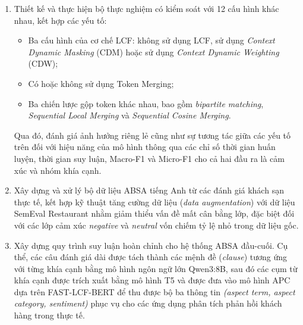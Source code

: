 \begin{enumerate}
\begin{itemize}
        \item \textbf{Sequential Cosine Merging (SCM)}: duyệt tuần tự chuỗi token theo vị trí từ trái sang phải, tại mỗi bước chọn token trái nhất chưa được bảo vệ và gộp với token có độ tương đồng cosine cao nhất trong toàn chuỗi, đồng thời bảo vệ các token thuộc vị trí khía cạnh (được đánh dấu bởi LCF) nhằm hạn chế mất mát thông tin ngữ nghĩa quan trọng.
    \end{itemize}

\item Thiết kế và thực hiện bộ thực nghiệm có kiểm soát với 12 cấu hình khác nhau, kết hợp các yếu tố:
\begin{itemize}
    \item Ba cấu hình của cơ chế LCF: không sử dụng LCF, sử dụng \textit{Context Dynamic Masking} (CDM) hoặc sử dụng \textit{Context Dynamic Weighting} (CDW);
    
    \item Có hoặc không sử dụng Token Merging;
    
    \item Ba chiến lược gộp token khác nhau, bao gồm \textit{bipartite matching}, \textit{Sequential Local Merging} và \textit{Sequential Cosine Merging}.
\end{itemize}
Qua đó, đánh giá ảnh hưởng riêng lẻ cũng như sự tương tác giữa các yếu tố trên đối với hiệu năng của mô hình thông qua các chỉ số thời gian huấn luyện, thời gian suy luận, Macro-F1 và Micro-F1 cho cả hai đầu ra là cảm xúc và nhóm khía cạnh.

    \item Xây dựng và xử lý bộ dữ liệu ABSA tiếng Anh từ các đánh giá khách sạn thực tế, kết hợp kỹ thuật tăng cường dữ liệu (\textit{data augmentation}) với dữ liệu SemEval Restaurant nhằm giảm thiểu vấn đề mất cân bằng lớp, đặc biệt đối với các lớp cảm xúc \textit{negative} và \textit{neutral} vốn chiếm tỷ lệ nhỏ trong dữ liệu gốc.

    \item Xây dựng quy trình suy luận hoàn chỉnh cho hệ thống ABSA đầu-cuối. Cụ thể, các câu đánh giá dài được tách thành các mệnh đề (\textit{clause}) tương ứng với từng khía cạnh bằng mô hình ngôn ngữ lớn Qwen3:8B, sau đó các cụm từ khía cạnh được trích xuất bằng mô hình T5 và được đưa vào mô hình APC dựa trên FAST-LCF-BERT để thu được bộ ba thông tin \textit{(aspect term, aspect category, sentiment)} phục vụ cho các ứng dụng phân tích phản hồi khách hàng trong thực tế.

\end{enumerate}

